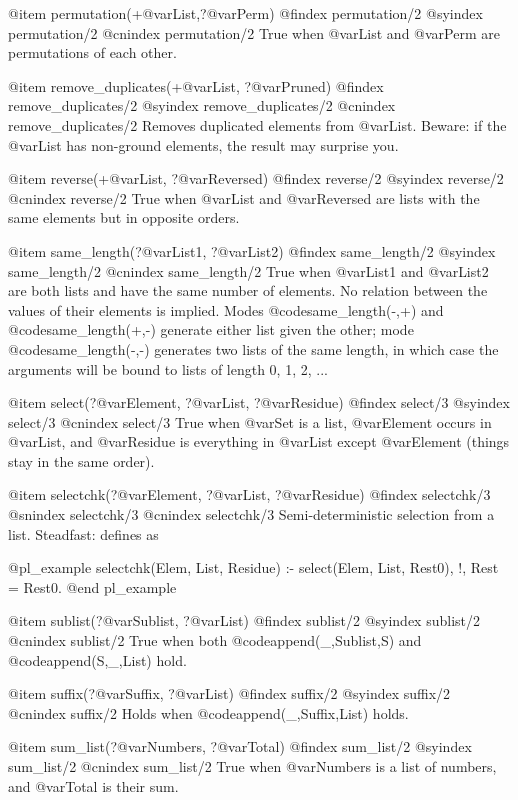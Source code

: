 @item permutation(+@var{List},?@var{Perm})
@findex permutation/2
@syindex permutation/2
@cnindex permutation/2
True when @var{List} and @var{Perm} are permutations of each other.

@item remove_duplicates(+@var{List}, ?@var{Pruned})
@findex remove_duplicates/2
@syindex remove_duplicates/2
@cnindex remove_duplicates/2
Removes duplicated elements from @var{List}.  Beware: if the @var{List} has
non-ground elements, the result may surprise you.

@item reverse(+@var{List}, ?@var{Reversed})
@findex reverse/2
@syindex reverse/2
@cnindex reverse/2
True when @var{List} and @var{Reversed} are lists with the same elements
but in opposite orders. 
 
@item same_length(?@var{List1}, ?@var{List2})
@findex same_length/2
@syindex same_length/2
@cnindex same_length/2
True when @var{List1} and @var{List2} are both lists and have the same number
of elements.  No relation between the values of their elements is
implied.
Modes @code{same_length(-,+)} and @code{same_length(+,-)} generate either list given
the other; mode @code{same_length(-,-)} generates two lists of the same length,
in which case the arguments will be bound to lists of length 0, 1, 2, ...

@item select(?@var{Element}, ?@var{List}, ?@var{Residue})
@findex select/3
@syindex select/3
@cnindex select/3
True when @var{Set} is a list, @var{Element} occurs in @var{List}, and
@var{Residue} is everything in @var{List} except @var{Element} (things
stay in the same order).
 
@item selectchk(?@var{Element}, ?@var{List}, ?@var{Residue})
@findex selectchk/3
@snindex selectchk/3
@cnindex selectchk/3
Semi-deterministic selection from a list. Steadfast: defines as

@pl_example
selectchk(Elem, List, Residue) :-
        select(Elem, List, Rest0), !,
        Rest = Rest0.
@end pl_example

 
@item sublist(?@var{Sublist}, ?@var{List})
@findex sublist/2
@syindex sublist/2
@cnindex sublist/2
True when both @code{append(_,Sublist,S)} and @code{append(S,_,List)} hold.
 
@item suffix(?@var{Suffix}, ?@var{List})
@findex suffix/2
@syindex suffix/2
@cnindex suffix/2
Holds when @code{append(_,Suffix,List)} holds.

@item sum_list(?@var{Numbers}, ?@var{Total})
@findex sum_list/2
@syindex sum_list/2
@cnindex sum_list/2
True when @var{Numbers} is a list of numbers, and @var{Total} is their sum.


